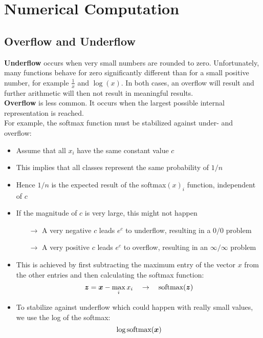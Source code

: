 \section{Numerical Computation}
\begin{multicols}{2}
	\subsection{Overflow and Underflow}
	\textbf{Underflow} occurs when very small numbers are rounded to zero.
	Unfortunately, many functions behave for zero significantly different than for a small positive number, for example $\frac{1}{x}$ and $\log(x)$. In both cases, an overflow will result and further arithmetic will then not result in meaningful results.\\

	\textbf{Overflow} is less common. It occurs when the largest possible internal representation is reached.\\

	For example, the softmax function must be stabilized against under- and overflow:
	\begin{itemize}
		\item Assume that all $x_i$ have the same constant value $c$
		\item This implies that all classes represent the same probability of $1/n$
		\item Hence $1/n$ is the expected result of the softmax$(x)_i$ function, independent of $c$
		\item If the magnitude of $c$ is very large, this might not happen
		\begin{itemize}
			\item[$\rightarrow$] A very negative $c$ leads $e^c$ to underflow, resulting in a $0/0$ problem
			\item[$\rightarrow$] A very positive $c$ leads $e^c$ to overflow, resulting in an $\infty/\infty$ problem
		\end{itemize}
		\item This is achieved by first subtracting the maximum entry of the vector $x$ from the other entries and then calculating the softmax function:
		$$\bol{z}=\bol{x}-\max_ix_i \quad\rightarrow\quad \text{softmax}(\bol{z})$$
		\item To stabilize against underflow which could happen with really small values, we use the log of the softmax:
		\[ \log \text{softmax}(\bol{x}) \]
	\end{itemize}


\end{multicols}
